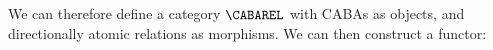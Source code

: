 \documentclass[a4paper,UKenglish,cleveref, autoref]{lipics-v2021}
\begin{document}
We can therefore define a category \(\CABAREL\) with CABAs as objects, and
directionally atomic relations as morphisms. We can then construct a functor:

%
%
%
%   
\end{document}
